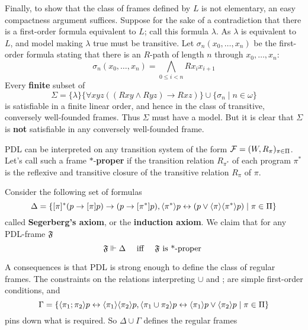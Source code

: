 \documentclass[11pt]{article}
\begin{document}
\begin{examplle}[]
Finally, to show that the class of frames defined by \(L\) is not elementary,
an easy compactness argument suffices. Suppose for the sake of a
contradiction that there is a first-order formula equivalent to \(L\); call
this formula \(\lambda\). As \(\lambda\) is equivalent to \(L\), and model making \(\lambda\) true must be
transitive. Let \(\sigma_n(x_0,\dots,x_n)\) be the first-order formula
stating that there is an \(R\)-path of length \(n\) through
\(x_0,\dots,x_n\):
\begin{equation*}
\sigma_n(x_0,\dots,x_n)=\bigwedge_{0\le i<n}Rx_ix_{i+1}
\end{equation*}
Every \textbf{finite} subset of
\begin{equation*}
\Sigma=\{\lambda\}\{\forall xyz((Rxy\wedge Ryz)\to Rxz)\}\cup\{\sigma_n\mid n\in\omega\}
\end{equation*}
is satisfiable in a finite linear order, and hence in the class of
transitive, conversely well-founded frames. Thus \(\Sigma\) must have a model. But it
is clear that \(\Sigma\) is \textbf{not} satisfiable in any conversely well-founded frame.
\end{examplle}

\begin{examplle}[]
PDL can be interpreted on any transition system of the form
\(\mathcal{F}=(W,R_\pi)_{\pi\in\Pi}\). Let's call such a frame \(*\)-\textbf{proper} if the
transition relation \(R_{\pi^*}\) of each program \(\pi^*\) is the reflexive and
transitive closure of the transitive relation \(R_\pi\) of \(\pi\).

Consider the following set of formulas
\begin{equation*}
\Delta=\{[\pi]^*(p\to[\pi]p)\to(p\to[\pi^*]p),
\langle\pi^*\rangle p\leftrightarrow(p\vee\langle \pi\rangle\langle\pi^*\rangle p)\mid\pi\in\Pi\}
\end{equation*}
called \textbf{Segerberg's axiom}, or the \textbf{induction axiom}. We claim that for any
PDL-frame \(\mathfrak{F}\)
\begin{equation*}
\mathfrak{F}\Vdash\Delta \quad\text{ iff }\quad
\mathfrak{F}\text{ is *-proper }
\end{equation*}

A consequences is that PDL is strong enough to define the class of regular
frames. The constraints on the relations interpreting \(\cup\) and ; are
simple first-order conditions, and
\begin{equation*}
\Gamma=\{\langle\pi_1;\pi_2\rangle p\leftrightarrow\langle\pi_1\rangle\langle\pi_2\rangle p,
\langle \pi_1\cup\pi_2\rangle p\leftrightarrow\langle\pi_1\rangle p\vee\langle\pi_2\rangle p\mid\pi\in\Pi\}
\end{equation*}
pins down what is required. So \(\Delta\cup\Gamma\) defines the regular frames
\end{examplle}
\end{document}
